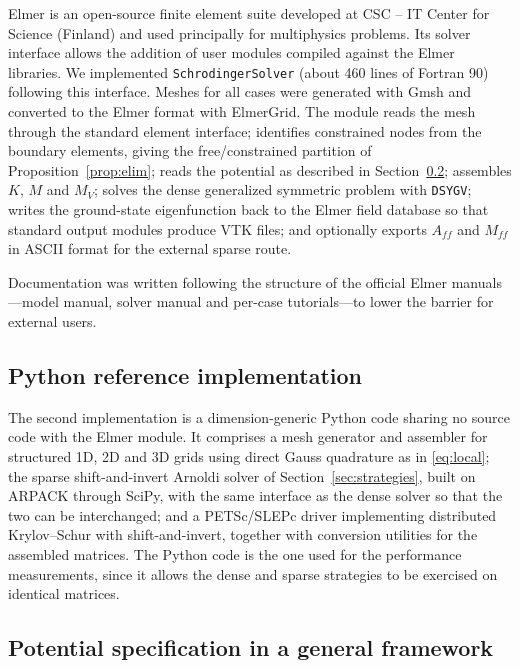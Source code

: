 \documentclass[pdflatex,sn-mathphys-num]{sn-jnl}
\theoremstyle{thmstyleone}%
\theoremstyle{thmstyletwo}%
\theoremstyle{thmstylethree}%
\begin{document}
\textsf{Elmer} \cite{elmer2024} is an open-source finite element suite developed
at CSC -- IT Center for Science (Finland) and used principally for multiphysics
problems. Its solver interface allows the addition of user modules compiled
against the \textsf{Elmer} libraries. We implemented \texttt{SchrodingerSolver}
(about 460 lines of Fortran 90) following this interface. Meshes for all cases were generated with \textsf{Gmsh} \cite{geuzaine2009}
and converted to the \textsf{Elmer} format with \textsf{ElmerGrid}. The module
reads the mesh through the standard element interface; identifies constrained nodes from
the boundary elements, giving the free/constrained partition of
Proposition~\ref{prop:elim}; reads the potential as described in
Section~\ref{sec:potential}; assembles $K$, $M$ and $M_V$; solves the dense
generalized symmetric problem with \texttt{DSYGV}; writes the ground-state
eigenfunction back to the \textsf{Elmer} field database so that standard output
modules produce VTK files; and optionally exports $A_{ff}$ and $M_{ff}$ in ASCII
format for the external sparse route.

Documentation was written following the structure of the official
\textsf{Elmer} manuals---model manual, solver manual and per-case
tutorials---to lower the barrier for external users.

\subsection{Python reference implementation}

The second implementation is a dimension-generic Python code sharing no source
code with the \textsf{Elmer} module. It comprises a mesh generator and assembler
for structured 1D, 2D and 3D grids using direct Gauss quadrature as in
\eqref{eq:local}; the sparse shift-and-invert Arnoldi solver of
Section~\ref{sec:strategies}, built on ARPACK through SciPy, with the same
interface as the dense solver so that the two can be interchanged; and a
PETSc/SLEPc driver implementing distributed Krylov--Schur with shift-and-invert,
together with conversion utilities for the assembled matrices. The Python code
is the one used for the performance measurements, since it allows the dense and
sparse strategies to be exercised on identical matrices.

\subsection{Potential specification in a general framework}\label{sec:potential}
\end{document}
